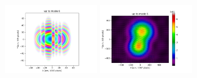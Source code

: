 \documentclass{iucr}              %
\begin{document}
\begin{figure}
\includegraphics[width=4cm]{Figures/interference_D_uptomode0006_csd.png}
\includegraphics[width=4cm]{Figures/interference_D_uptomode0006_pattern.png}

\label{young}
\end{figure}

%
%
\end{document}
